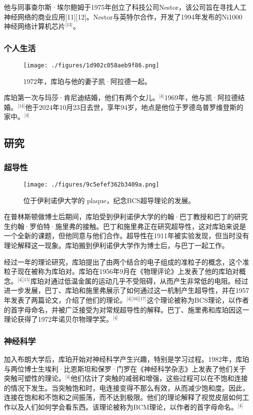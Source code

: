 他与同事查尔斯·埃尔鲍姆于1975年创立了科技公司Nestor，该公司旨在寻找人工神经网络的商业应用[11][12]。Nestor与英特尔合作，开发了1994年发布的Ni1000神经网络计算机芯片\(^\text{[13]}\)。
\subsubsection{个人生活}
\begin{figure}[ht]
\centering
\texttt{[image: ./figures/1d902c058aeb9f86.png]}
\caption{1972年，库珀与他的妻子凯·阿拉德一起。} \label{fig_LAkb_1}
\end{figure}
库珀第一次与玛莎·肯尼迪结婚，他们有两个女儿。\(^\text{[4]}\)1969年，他与凯·阿拉德结婚。\(^\text{[14]}\)他于2024年10月23日去世，享年94岁，地点是他位于罗德岛普罗维登斯的家中。\(^\text{[4]}\)
\subsection{研究}
\subsubsection{超导性}
\begin{figure}[ht]
\centering
\texttt{[image: ./figures/9c5efef362b3409a.png]}
\caption{位于伊利诺伊大学的 plaque，纪念BCS超导理论的发展。} \label{fig_LAkb_2}
\end{figure}
在普林斯顿做博士后期间，库珀受到伊利诺伊大学的约翰·巴丁教授和巴丁的研究生约翰·罗伯特·施里弗的接触。巴丁和施里弗正在研究超导性，这对库珀来说是一个全新的课题，但他同意与他们合作。超导性在1911年被实验发现，但当时没有理论解释这一现象。库珀搬到伊利诺伊大学作为博士后，与巴丁一起工作。

经过一年的理论研究，库珀提出了由两个结合的电子组成的准粒子的概念，这个准粒子现在被称为库珀对。库珀在1956年9月在《物理评论》上发表了他的库珀对概念。\(^\text{[4][15]}\)库珀对通过低温金属的运动几乎不受阻碍，从而产生非常低的电阻。经过进一步发展，巴丁、库珀和施里弗展示了如何通过这一机制产生超导性，并在1957年发表了两篇论文，介绍了他们的理论。\(^\text{[4][16][17]}\)这个理论被称为BCS理论，以作者的首字母命名，并被广泛接受为对常规超导性的解释。巴丁、施里弗和库珀因这一理论获得了1972年诺贝尔物理学奖。\(^\text{[4]}\)
\subsubsection{神经科学}
加入布朗大学后，库珀开始对神经科学产生兴趣，特别是学习过程。1982年，库珀与两位博士生埃利·比恩斯坦和保罗·门罗在《神经科学杂志》上发表了他们关于突触可塑性的理论。\(^\text{[4]}\)他们估计了突触的减弱和增强，这些过程可以在不饱和连接的情况下发生。当突触饱和时，电连接变得不那么有效，从而减少饱和度。因此，连接在饱和和不饱和之间振荡，而不达到极限。他们的理论解释了视觉皮层如何工作以及人们如何学会看东西。该理论被称为BCM理论，以作者的首字母命名。\(^\text{[4]}\)
